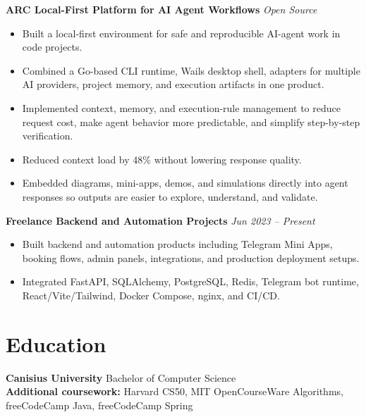\documentclass[10pt,a4paper]{article}
\begin{document}
\textbf{ARC \textbar{} Local-First Platform for AI Agent Workflows} \hfill \textit{Open Source}
\begin{itemize}
  \item Built a local-first environment for safe and reproducible AI-agent work in code projects.
  \item Combined a Go-based CLI runtime, Wails desktop shell, adapters for multiple AI providers, project memory, and execution artifacts in one product.
  \item Implemented context, memory, and execution-rule management to reduce request cost, make agent behavior more predictable, and simplify step-by-step verification.
  \item Reduced context load by 48\% without lowering response quality.
  \item Embedded diagrams, mini-apps, demos, and simulations directly into agent responses so outputs are easier to explore, understand, and validate.
\end{itemize}

\textbf{Freelance Backend and Automation Projects} \hfill \textit{Jun 2023 -- Present}
\begin{itemize}
  \item Built backend and automation products including Telegram Mini Apps, booking flows, admin panels, integrations, and production deployment setups.
  \item Integrated FastAPI, SQLAlchemy, PostgreSQL, Redis, Telegram bot runtime, React/Vite/Tailwind, Docker Compose, nginx, and CI/CD.
\end{itemize}

\section*{Education}
\textbf{Canisius University} \textbar{} Bachelor of Computer Science\\
\textbf{Additional coursework:} Harvard CS50, MIT OpenCourseWare Algorithms, freeCodeCamp Java, freeCodeCamp Spring
\end{document}
